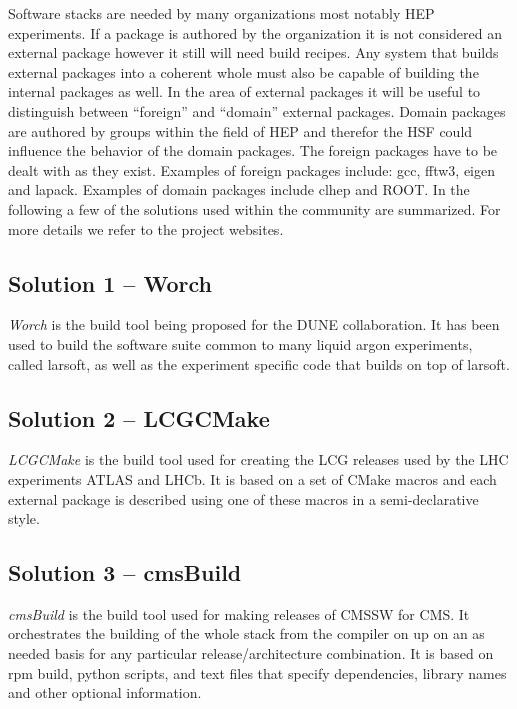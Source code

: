 \documentclass[12pt,a4paper]{article}
\begin{document}
Software stacks are needed by many organizations most notably HEP experiments.  If a package is authored by the organization it is not considered an external package however it still will need build recipes. Any system that builds external packages into a coherent whole must also be capable of building the internal packages as well.  In the area of external packages it will be useful to distinguish between ``foreign'' and ``domain'' external packages. Domain packages are authored by groups within the field of HEP and therefor the HSF could influence the behavior of the domain packages. The foreign packages have to be dealt with as they exist. Examples of foreign packages include: gcc, fftw3, eigen and lapack. Examples of domain packages include clhep and ROOT. In the following a few of the solutions used within the community are summarized. For more details we refer to the project websites. 

\subsection{Solution 1 -- Worch}
\emph{Worch}\cite{worch} is the build tool being proposed for the DUNE collaboration.  It has been used to build the software suite common to many liquid argon experiments, called larsoft, as well as the experiment specific code that builds on top of larsoft.

\subsection{Solution 2 -- LCGCMake}

\emph{LCGCMake}\cite{lcgcmake} is the build tool used for creating the LCG releases used by the LHC experiments ATLAS and LHCb. It is based on a set of CMake macros and each external package is described using one of these macros in a semi-declarative style. 

\subsection{Solution 3 -- cmsBuild} 

\emph{cmsBuild}\cite{cmsbuild} is the build tool used for making releases of CMSSW for CMS.  It orchestrates the building of the whole stack from the compiler on up on an as needed basis for any particular release/architecture combination.  It is based on rpm build, python scripts, and text files that specify dependencies, library names and other optional information.
\end{document}
